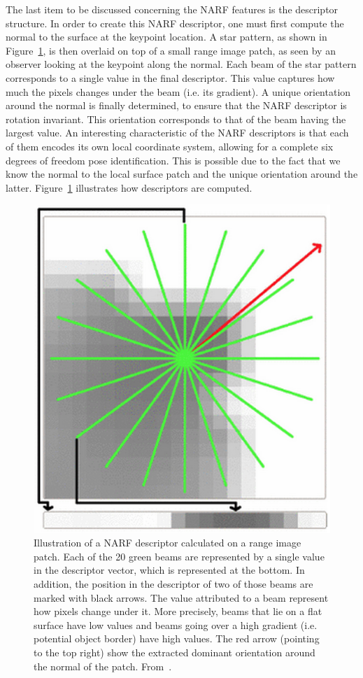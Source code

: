 The last item to be discussed concerning the NARF features is the descriptor structure. In order to create this NARF descriptor, one must first compute the normal to the surface at the keypoint location. A star pattern, as shown in Figure~\ref{fig:narf_descriptor}, is then overlaid on top of a small range image patch, as seen by an observer looking at the keypoint along the normal. Each beam of the star pattern corresponds to a single value in the final descriptor. This value captures how much the pixels changes under the beam (i.e. its gradient). A unique orientation around the normal is finally determined, to ensure that the NARF descriptor is rotation invariant. This orientation corresponds to that of the beam having the largest value. An interesting characteristic of the NARF descriptors is that each of them encodes its own local coordinate system, allowing for a complete six degrees of freedom pose identification. This is possible due to the fact that we know the normal to the local surface patch and the unique orientation around the latter. Figure~\ref{fig:narf_descriptor} illustrates how descriptors are computed.

\begin{figure}
    \centering
    \includegraphics[width=0.4\linewidth]{img/chap_slam/narf.png}
    \caption[Illustration of a NARF descriptor calculated on a range image patch.]{Illustration of a NARF descriptor calculated on a range image patch. Each of the 20 green beams are represented by a single value in the descriptor vector, which is represented at the bottom. In addition, the position in the descriptor of two of those beams are marked with black arrows. The value attributed to a beam represent how pixels change under it. More precisely, beams that lie on a flat surface have low values and beams going over a high gradient (i.e. potential object border) have high values. The red arrow (pointing to the top right) show the extracted dominant orientation around the normal of the patch. From~\cite{Steder2011a}.}
    \label{fig:narf_descriptor}
\end{figure}


